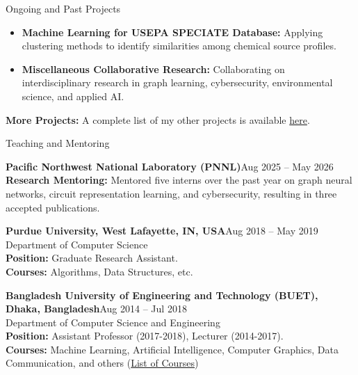 \documentclass{resume} %
\begin{document}
\begin{rSection}{Ongoing and Past Projects}
\begin{itemize}
    \item \textbf{Machine Learning for USEPA SPECIATE Database:}
    Applying clustering methods to identify similarities among chemical source profiles.

    \item \textbf{Miscellaneous Collaborative Research:}
    Collaborating on interdisciplinary research in graph learning, cybersecurity, environmental science, and applied AI.
\end{itemize}

\textbf{More Projects:} A complete list of my other projects is available \href{https://sites.google.com/site/siddhartha047/}{here}.

\end{rSection}

\begin{rSection}{Teaching and Mentoring} 

\textbf{Pacific Northwest National Laboratory (PNNL)}\hfill Aug 2025 -- May 2026\\
\textbf{Research Mentoring:} Mentored five interns over the past year on graph neural networks, circuit representation learning, and cybersecurity, resulting in three accepted publications.

\textbf{Purdue University, West Lafayette, IN, USA}\hfill Aug 2018 -- May 2019\\
Department of Computer Science\\
\textbf{Position:} Graduate Research Assistant.\\
\textbf{Courses:} Algorithms, Data Structures, etc.




\textbf{Bangladesh University of Engineering and Technology (BUET), Dhaka, Bangladesh}\hfill Aug 2014 -- Jul 2018\\
Department of Computer Science and Engineering\\
\textbf{Position:} Assistant Professor (2017-2018), Lecturer (2014-2017).\\
\textbf{Courses:} Machine Learning, Artificial Intelligence, Computer Graphics, Data Communication, and others (\href{https://sites.google.com/site/siddhartha047/courses}{List of Courses})

\end{rSection}
\end{document}

